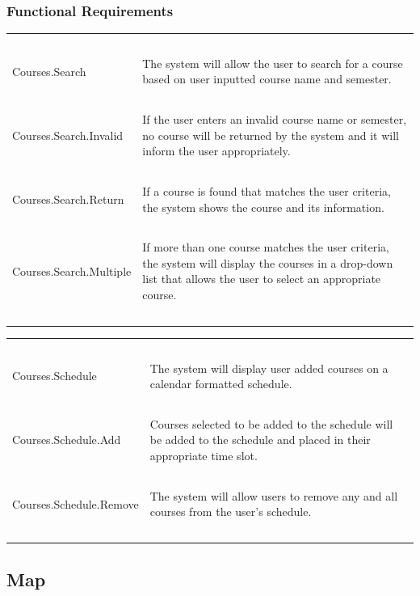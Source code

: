 \documentclass[pdftex,12pt,letter]{article}
\begin{document}
\subsubsection{Functional Requirements}
\begin{table}[!h]
\begin{tabularx}{\textwidth }[t]{|l Y|}
\hline
~&~\\
Courses.Search & The system will allow the user to search for a course based on user inputted course name and semester.\\ 
~&~\\
Courses.Search.Invalid & If the user enters an invalid course name or semester, no course will be returned by the system and it will inform the user appropriately.\\
~&~\\
Courses.Search.Return & If a course is found that matches the user criteria, the system shows the course and its information. \\
~&~\\
Courses.Search.Multiple & If more than one course matches the user criteria, the system will display the courses in a drop-down list that allows the user to select an appropriate course.\\
~&~\\
\hline
\end{tabularx}
\end{table}
\begin{table}[!h]
\begin{tabularx}{\textwidth }[t]{|l Y|}
\hline
~&~\\
Courses.Schedule & The system will display user added courses on a calendar formatted schedule.\\
~&~\\
Courses.Schedule.Add & Courses selected to be added to the schedule will be added to the schedule and placed in their appropriate time slot.\\
~&~\\
Courses.Schedule.Remove & The system will allow users to remove any and all courses from the user's schedule.\\
~&~\\
\hline
\end{tabularx}
\end{table}
\FloatBarrier
\subsection{Map}
\end{document}
